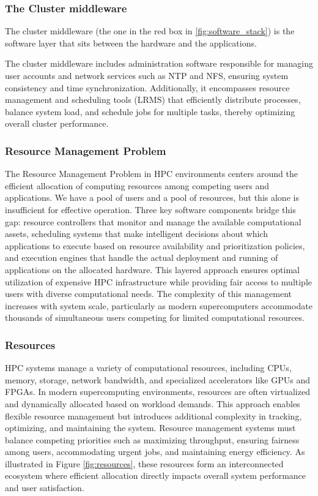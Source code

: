 \subsubsection{The Cluster middleware}

The cluster middleware (the one in the red box in \cref{fig:software_stack}) is the software layer that sits between the hardware and the applications. 

The cluster middleware includes administration software responsible for managing user accounts and network services such as NTP and NFS, ensuring system consistency and time synchronization. Additionally, it encompasses resource management and scheduling tools (LRMS) that efficiently distribute processes, balance system load, and schedule jobs for multiple tasks, thereby optimizing overall cluster performance.

\subsubsection{Resource Management Problem}

The Resource Management Problem in HPC environments centers around the efficient allocation of computing resources among competing users and applications. We have a pool of users and a pool of resources, but this alone is insufficient for effective operation. Three key software components bridge this gap: resource controllers that monitor and manage the available computational assets, scheduling systems that make intelligent decisions about which applications to execute based on resource availability and prioritization policies, and execution engines that handle the actual deployment and running of applications on the allocated hardware. This layered approach ensures optimal utilization of expensive HPC infrastructure while providing fair access to multiple users with diverse computational needs. The complexity of this management increases with system scale, particularly as modern supercomputers accommodate thousands of simultaneous users competing for limited computational resources.

\subsubsection{Resources}

HPC systems manage a variety of computational resources, including CPUs, memory, storage, network bandwidth, and specialized accelerators like GPUs and FPGAs. In modern supercomputing environments, resources are often virtualized and dynamically allocated based on workload demands. This approach enables flexible resource management but introduces additional complexity in tracking, optimizing, and maintaining the system. Resource management systems must balance competing priorities such as maximizing throughput, ensuring fairness among users, accommodating urgent jobs, and maintaining energy efficiency. As illustrated in Figure \ref{fig:resources}, these resources form an interconnected ecosystem where efficient allocation directly impacts overall system performance and user satisfaction.

